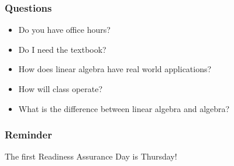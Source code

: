 \documentclass[aspectratio=1610]{beamer}
\begin{document}
\begin{frame}\frametitle{Questions}

\begin{itemize}
\item Do you have office hours?
\item Do I need the textbook?
\item How does linear algebra have real world applications?
\item How will class operate?
\item What is the difference between linear algebra and algebra?
\end{itemize}
\end{frame}



\begin{frame}\frametitle{Reminder}
The first Readiness Assurance Day is Thursday!
\end{frame}
\end{document}
